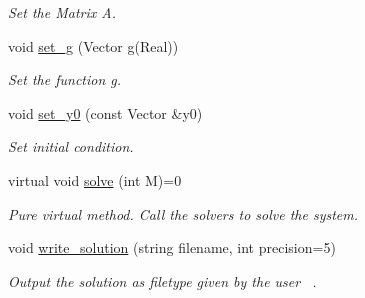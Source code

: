 \begin{DoxyCompactItemize}
\begin{DoxyCompactList}\small\item\em Set the Matrix A. \end{DoxyCompactList}\item 
\mbox{\label{class_o_d_e___system_a6906f9069496452cab2b56b6a49635d1}} 
void \mbox{\hyperlink{class_o_d_e___system_a6906f9069496452cab2b56b6a49635d1}{set\+\_\+g}} (Vector \mbox{\hyperlink{class_o_d_e___system_a2dee2a4b3468547c3ddab15edfc8ddfd}{g}}(Real))
\begin{DoxyCompactList}\small\item\em Set the function g. \end{DoxyCompactList}\item 
\mbox{\label{class_o_d_e___system_a1856c9b15a41ca733e509e44f4535f5f}} 
void \mbox{\hyperlink{class_o_d_e___system_a1856c9b15a41ca733e509e44f4535f5f}{set\+\_\+y0}} (const Vector \&y0)
\begin{DoxyCompactList}\small\item\em Set initial condition. \end{DoxyCompactList}\item 
virtual void \mbox{\hyperlink{class_o_d_e___system_a5fe78282ecf67d851f1a2363a028e6dd}{solve}} (int M)=0
\begin{DoxyCompactList}\small\item\em Pure virtual method. Call the solvers to solve the system. \end{DoxyCompactList}\item 
void \mbox{\hyperlink{class_o_d_e___system_ad07810b15fa1d891b64a83812433fef6}{write\+\_\+solution}} (string filename, int precision=5)
\begin{DoxyCompactList}\small\item\em Output the solution as filetype given by the user~\newline
. \end{DoxyCompactList}\end{DoxyCompactItemize}
